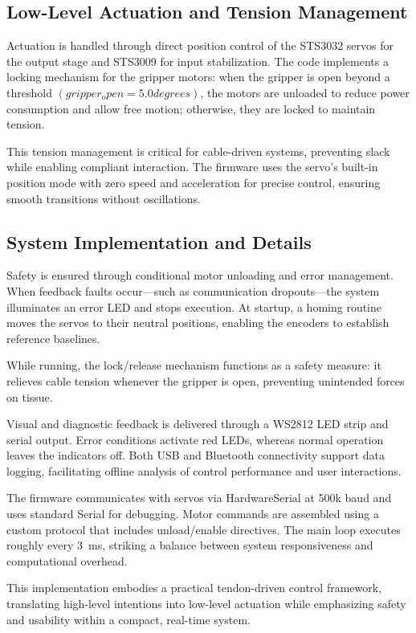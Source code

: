 \subsection{Low-Level Actuation and Tension Management}
Actuation is handled through direct position control of the STS3032 servos for the output stage and STS3009 for input stabilization. The code implements a locking mechanism for the gripper motors: when the gripper is open beyond a threshold $(gripper_open = 5.0 degrees)$, the motors are unloaded to reduce power consumption and allow free motion; otherwise, they are locked to maintain tension.

This tension management is critical for cable-driven systems, preventing slack while enabling compliant interaction. The firmware uses the servo's built-in position mode with zero speed and acceleration for precise control, ensuring smooth transitions without oscillations.

\subsection{System Implementation and Details}
Safety is ensured through conditional motor unloading and error management. When feedback faults occur—such as communication dropouts—the system illuminates an error LED and stops execution. At startup, a homing routine moves the servos to their neutral positions, enabling the encoders to establish reference baselines.

While running, the lock/release mechanism functions as a safety measure: it relieves cable tension whenever the gripper is open, preventing unintended forces on tissue.

Visual and diagnostic feedback is delivered through a WS2812 LED strip and serial output. Error conditions activate red LEDs, whereas normal operation leaves the indicators off. Both USB and Bluetooth connectivity support data logging, facilitating offline analysis of control performance and user interactions.

The firmware communicates with servos via HardwareSerial at 500k baud and uses standard Serial for debugging. Motor commands are assembled using a custom protocol that includes unload/enable directives. The main loop executes roughly every 3~ms, striking a balance between system responsiveness and computational overhead.

This implementation embodies a practical tendon-driven control framework, translating high-level intentions into low-level actuation while emphasizing safety and usability within a compact, real-time system.
